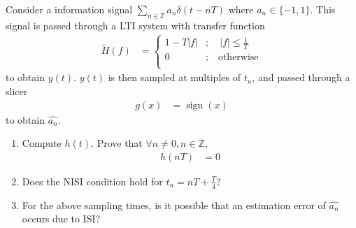 \documentclass[titlepage, fleqn, a4paper, 12pt, twoside]{article}
\theoremstyle{definition}
\theoremstyle{theorem}
\renewcommand{\tilde}{\widetilde}
\renewcommand{\hat}{\widehat}
\DeclareMathOperator{\sign}{\mathrm{sign}}
\begin{document}
\begin{question}
	Consider a information signal $\sum\limits_{n \in \mathbb{Z}} a_n \delta(t - n T)$ where $a_n \in \{-1,1\}$.
	This signal is passed through a LTI system with transfer function
	\begin{align*}
		\tilde{H}(f) &=
			\begin{cases}
				1 - T |f| &;\quad |f| \le \frac{1}{T}\\
				0 &;\quad \text{otherwise}\\
			\end{cases}
	\end{align*}
	to obtain $y(t)$.
	$y(t)$ is then sampled at multiples of $t_n$, and passed through a slicer
	\begin{align*}
		g(x) &= \sign(x)
	\end{align*}
	to obtain $\hat{a_n}$.
	\begin{enumerate}
		\item
			Compute $h(t)$.
			Prove that $\forall n \neq 0, n \in \mathbb{Z}$,
			\begin{align*}
				h(n T) &= 0
			\end{align*}
		\item
			Does the NISI condition hold for $t_n = n T + \frac{T}{4}$?
		\item
			For the above sampling times, is it possible that an estimation error of $\hat{a_n}$ occurs due to ISI?
	\end{enumerate}
\end{question}
\end{document}

